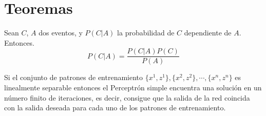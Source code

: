 \chapter*{Teoremas}


\begin{theorem}[Bayes]
    \label{theorem:bayes}
    Sean $C$, $A$ dos eventos, y $P(C|A)$ la probabilidad de $C$ dependiente de $A$. Entonces.
    \[ P(C|A) = \frac{P(C|A) P(C)}{P(A)} \]
\end{theorem}

\begin{theorem}
    \label{theorem:ConvergenciaRosenblatt}
    Si el conjunto de patrones de entrenamiento $ \{x^{1}, z^{1}\}, \{x^{2}, z^{2}\}, \cdots, \{x^{n}, z^{n}\} $ es linealmente separable entonces el Perceptrón simple encuentra una solución en un número finito de iteraciones, es decir, consigue que la salida de la red coincida con la salida deseada para cada uno de los patrones de entrenamiento.
\end{theorem}